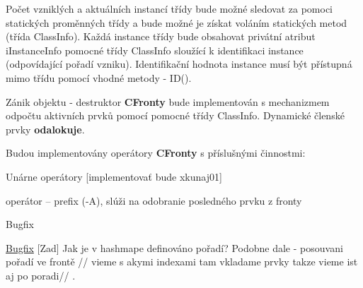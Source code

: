 \begin{DoxyEnumerate}
\begin{DoxyItemize}
\end{DoxyItemize}
\item Počet vzniklých a aktuálních instancí třídy {} bude možné sledovat za pomoci statických proměnných třídy a bude možné je získat voláním statických metod (třída {\ttfamily Class\+Info}). Každá instance třídy {} bude obsahovat privátní atribut {\ttfamily i\+Instance\+Info} pomocné třídy {\ttfamily Class\+Info} sloužící k identifikaci instance (odpovídající pořadí vzniku). Identifikační hodnota instance musí být přístupná mimo třídu pomocí vhodné metody -\/ {\ttfamily I\+D()}.
\item Zánik objektu -\/ destruktor {\bfseries C\+Fronty} bude implementován s mechanizmem odpočtu aktivních prvků pomocí pomocné třídy {\ttfamily Class\+Info}. Dynamické členské prvky {\bfseries odalokuje}.
\item Budou implementovány operátory {\bfseries C\+Fronty} s příslušnými činnostmi\+:
\begin{DoxyItemize}
\item Unárne operátory \mbox{[}implementovať bude xkunaj01\mbox{]}
\begin{DoxyItemize}
\item operátor – prefix (-\/A), slúži na odobranie posledného prvku z fronty\begin{DoxyRefDesc}{Bugfix}
\item[\hyperlink{bugfix__bugfix000013}{Bugfix}]\mbox{[}Zad\mbox{]} Jak je v hashmape definováno pořadí? Podobne dale -\/ posouvani pořadí ve frontě // vieme s akymi indexami tam vkladame prvky takze vieme ist aj po poradi// .\end{DoxyRefDesc}


\end{DoxyItemize}
\end{DoxyItemize}
\end{DoxyEnumerate}
